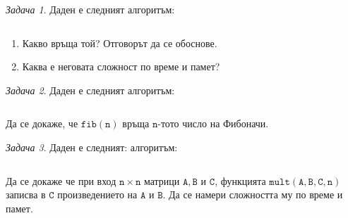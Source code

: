 \documentclass{article}
\theoremstyle{definition}
\theoremstyle{plain}
\theoremstyle{remark}
\newtheorem{problem}{Задача}
\theoremstyle{definition}
\begin{document}
\pagebreak

\begin{problem}
Даден е следният алгоритъм:
\inputminted[linenos]{c++}{algorithms/alg.cpp}

\begin{enumerate}
    \item Какво връща той? Отговорът да се обоснове.
    \item Каква е неговата сложност по време и памет?
\end{enumerate}
\end{problem}

\begin{problem}
Даден е следният алгоритъм:
\inputminted[linenos]{c++}{algorithms/fibonacci.cpp}

Да се докаже, че $\mathtt{fib(n)}$ връща $\mathtt{n}$-тото число на Фибоначи.
\end{problem}

\begin{problem}
Даден е следният: алгоритъм:
\inputminted[linenos]{c++}{algorithms/mult.cpp}

Да се докаже че при вход $\mathtt{n \times n}$ матрици $\mathtt{A, B}$ и $\mathtt{C}$, функцията $\mathtt{mult(A, B, C, n)}$ записва в $\mathtt{C}$ произведението на $\mathtt{A}$ и $\mathtt{B}$.
Да се намери сложността му по време и памет.
\end{problem}
\end{document}

